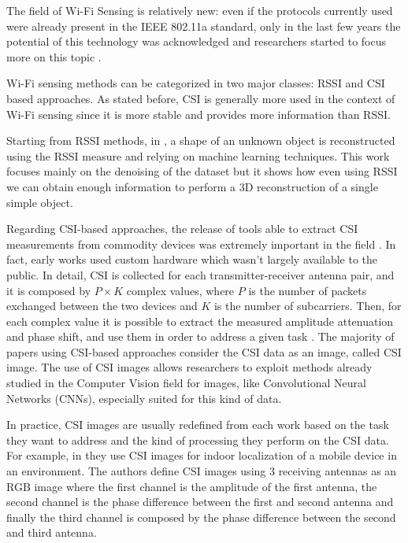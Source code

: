 \documentclass[binding=0.6cm,noexaminfo]{sapthesis}
\begin{document}
The field of Wi-Fi Sensing is relatively new: even if the protocols currently used were already present in the IEEE 802.11a standard, only in the last few years the potential of this technology was acknowledged and researchers started to focus more on this topic \cite{white-paper-wifi-sensing}.

Wi-Fi sensing methods can be categorized in two major classes: RSSI and CSI based approaches. As stated before, CSI is generally more used in the context of Wi-Fi sensing since it is more stable and provides more information than RSSI.

Starting from RSSI methods, in \cite{3d-imaging-sparse-wireless-signal-reconstruction-ml}, a shape of an unknown object is reconstructed using the RSSI measure and relying on machine learning techniques. This work focuses mainly on the denoising of the dataset but it shows how even using RSSI we can obtain enough information to perform a 3D reconstruction of a single simple object.

Regarding CSI-based approaches, the release of tools able to extract CSI measurements from commodity devices was extremely important in the field \cite{tool-release}. In fact, early works used custom hardware which wasn't largely available to the public.
In detail, CSI is collected for each transmitter-receiver antenna pair, and it is composed by $P \times K$ complex values, where $P$ is the number of packets exchanged between the two devices and $K$ is the number of subcarriers. Then, for each complex value it is possible to extract the measured amplitude attenuation and phase shift, and use them in order to address a given task \cite{wifi-sensing-survey}.
The majority of papers using CSI-based approaches consider the CSI data as an image, called CSI image. The use of CSI images allows researchers to exploit methods already studied in the Computer Vision field for images, like Convolutional Neural Networks (CNNs), especially suited for this kind of data.

In practice, CSI images are usually redefined from each work based on the task they want to address and the kind of processing they perform on the CSI data. For example, in \cite{cnn-wifi-localization} they use CSI images for indoor localization of a mobile device in an environment. The authors define CSI images using 3 receiving antennas as an RGB image where the first channel is the amplitude of the first antenna, the second channel is the phase difference between the first and second antenna and finally the third channel is composed by the phase difference between the second and third antenna.
\end{document}
